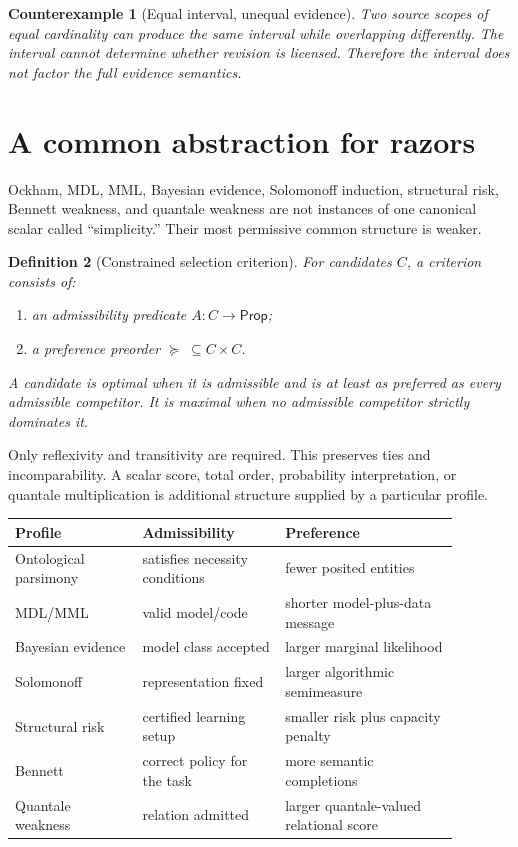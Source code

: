 \documentclass[11pt]{article}
\newtheorem{definition}{Definition}[section]
\newtheorem{counterexample}[definition]{Counterexample}
\theoremstyle{remark}
\begin{document}
\begin{counterexample}[Equal interval, unequal evidence]
Two source scopes of equal cardinality can produce the same interval while
overlapping differently.  The interval cannot determine whether revision is
licensed.  Therefore the interval does not factor the full evidence semantics.
\end{counterexample}

\section{A common abstraction for razors}

Ockham, MDL, MML, Bayesian evidence, Solomonoff induction, structural risk,
Bennett weakness, and quantale weakness are not instances of one canonical
scalar called ``simplicity.''  Their most permissive common structure is
weaker.

\begin{definition}[Constrained selection criterion]
For candidates $C$, a criterion consists of:
\begin{enumerate}[label=(\roman*)]
  \item an admissibility predicate $A:C\to\mathsf{Prop}$;
  \item a preference preorder $\succeq\;\subseteq C\times C$.
\end{enumerate}
A candidate is optimal when it is admissible and is at least as preferred as
every admissible competitor.  It is maximal when no admissible competitor
strictly dominates it.
\end{definition}

Only reflexivity and transitivity are required.  This preserves ties and
incomparability.  A scalar score, total order, probability interpretation, or
quantale multiplication is additional structure supplied by a particular
profile.

\begin{center}
\begin{tabular}{>{\raggedright\arraybackslash}p{0.25\linewidth}
                >{\raggedright\arraybackslash}p{0.29\linewidth}
                >{\raggedright\arraybackslash}p{0.34\linewidth}}
\toprule
Profile & Admissibility & Preference \\
\midrule
Ontological parsimony & satisfies necessity conditions & fewer posited entities \\
MDL/MML & valid model/code & shorter model-plus-data message \\
Bayesian evidence & model class accepted & larger marginal likelihood \\
Solomonoff & representation fixed & larger algorithmic semimeasure \\
Structural risk & certified learning setup & smaller risk plus capacity penalty \\
Bennett & correct policy for the task & more semantic completions \\
Quantale weakness & relation admitted & larger quantale-valued relational score \\
\bottomrule
\end{tabular}
\end{center}
\end{document}

